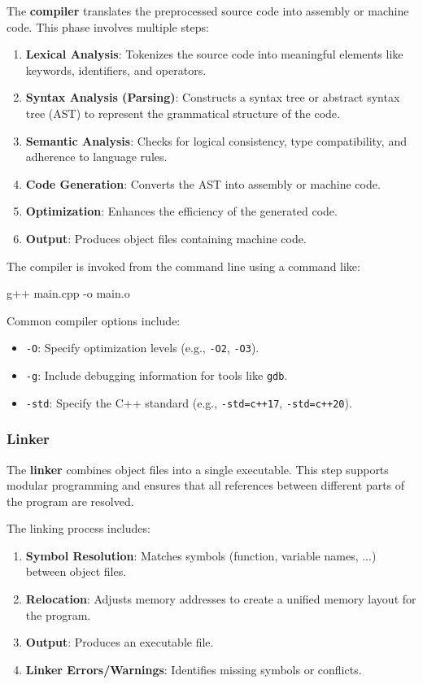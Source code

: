     The \textbf{compiler} translates the preprocessed source code into assembly or machine code. This phase involves multiple steps:
    \begin{enumerate}
        \item \textbf{Lexical Analysis}: Tokenizes the source code into meaningful elements like keywords, identifiers, and operators.
        \item \textbf{Syntax Analysis (Parsing)}: Constructs a syntax tree or abstract syntax tree (AST) to represent the grammatical structure of the code.
        \item \textbf{Semantic Analysis}: Checks for logical consistency, type compatibility, and adherence to language rules.
        \item \textbf{Code Generation}: Converts the AST into assembly or machine code.
        \item \textbf{Optimization}: Enhances the efficiency of the generated code.
        \item \textbf{Output}: Produces object files containing machine code.
    \end{enumerate}
    
The compiler is invoked from the command line using a command like:

\begin{codeblock}[language=bash, numbers=none]
g++ main.cpp -o main.o
\end{codeblock}
    
    Common compiler options include:
    \begin{itemize}
        \item \texttt{-O}: Specify optimization levels (e.g., \texttt{-O2}, \texttt{-O3}).
        \item \texttt{-g}: Include debugging information for tools like \texttt{gdb}.
        \item \texttt{-std}: Specify the C++ standard (e.g., \texttt{-std=c++17}, \texttt{-std=c++20}).
    \end{itemize}

\subsubsection{Linker}
    
    The \textbf{linker} combines object files into a single executable. This step supports modular programming and ensures that all references between different parts of the program are resolved.
    
    The linking process includes:
    \begin{enumerate}
        \item \textbf{Symbol Resolution}: Matches symbols (function, variable names, ...) between object files.
        \item \textbf{Relocation}: Adjusts memory addresses to create a unified memory layout for the program.
        \item \textbf{Output}: Produces an executable file.
        \item \textbf{Linker Errors/Warnings}: Identifies missing symbols or conflicts.
    \end{enumerate}

